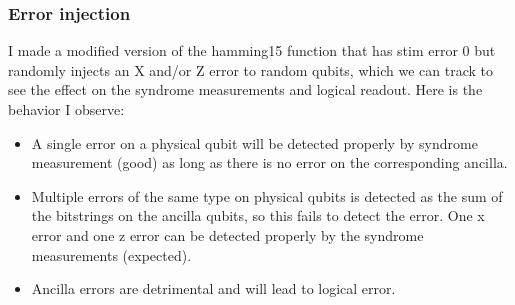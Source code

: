 \documentclass{article}
\begin{document}
\subsubsection{Error injection}
I made a modified version of the hamming15 function that has stim error 0 but randomly injects an X and/or Z error to random qubits, which we can track to see the effect on the syndrome measurements and logical readout. Here is the behavior I observe:
\begin{itemize}
    \item A single error on a physical qubit will be detected properly by syndrome measurement (good) as long as there is no error on the corresponding ancilla.
    \item Multiple errors of the same type on physical qubits is detected as the sum of the bitstrings on the ancilla qubits, so this fails to detect the error. One x error and one z error can be detected properly by the syndrome measurements (expected).
    \item Ancilla errors are detrimental and will lead to logical error.
\end{itemize}
\end{document}
